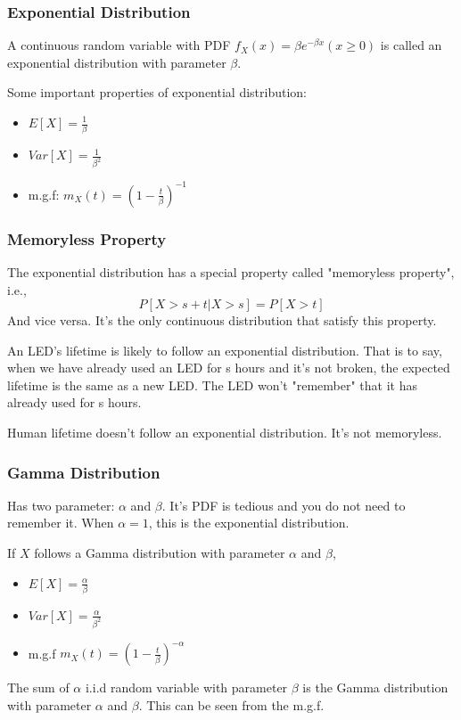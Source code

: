 \documentclass{beamer}
\begin{document}
\begin{frame}
    \frametitle{Exponential Distribution}
    A continuous random variable with PDF $f_X(x)=\beta e^{-\beta x}(x\geq 0)$ is called an exponential distribution with parameter $\beta$.\par
    Some important properties of exponential distribution:
    \begin{itemize}
        \item $E[X]=\frac{1}{\beta}$
        \item $Var[X]=\frac{1}{\beta^2}$
        \item m.g.f: $m_X(t)=(1-\frac{t}{\beta})^{-1}$
    \end{itemize}
    
\end{frame}

\begin{frame}
    \frametitle{Memoryless Property}
    The exponential distribution has a special property called "memoryless property", i.e., 
    \[P[X>s+t|X>s]=P[X>t]\]
    And vice versa. It's the only continuous distribution that satisfy this property.\par
    An LED's lifetime is likely to follow an exponential distribution. That is to say, when we have already used an LED for s hours and it's not broken, the expected lifetime is the same as a new LED. The LED won't "remember" that it has already used for s hours.\par
    Human lifetime doesn't follow an exponential distribution. It's not memoryless.
    
\end{frame}

\begin{frame}
    \frametitle{Gamma Distribution}
    Has two parameter: $\alpha$ and $\beta$. It's PDF is tedious and you do not need to remember it.
    When $\alpha=1$, this is the exponential distribution.\par
    If $X$ follows a Gamma distribution with parameter $\alpha$ and $\beta$,
    \begin{itemize}
        \item $E[X]=\frac{\alpha}{\beta}$
        \item $Var[X]=\frac{\alpha}{\beta^2}$
        \item m.g.f $m_X(t)=(1-\frac{t}{\beta})^{-\alpha}$
    \end{itemize}
    The sum of $\alpha$ i.i.d random variable with parameter $\beta$ is the Gamma distribution with parameter $\alpha$ and $\beta$. This can be seen from the m.g.f.
    

\end{frame}
\end{document}
